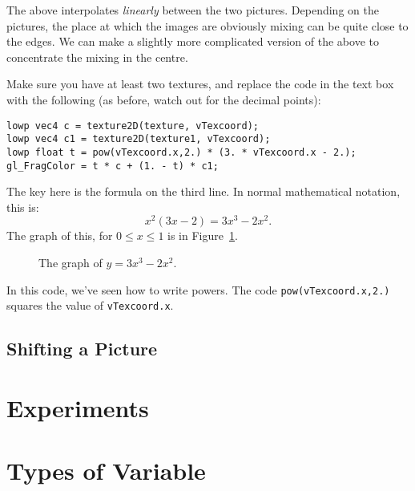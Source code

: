 \documentclass[
  html5,%
  mathml,%
  use filename%
]{internet}
\makeatletter
\let\origtikzsetnextfilename\tikzsetnextfilename
\def\tikzsetnextfilename#1{%
  \origtikzsetnextfilename{#1}
  \mysetlabel{#1}
}
\newcommand{\mysetlabel}[1]{%
  \gdef\mynextlabel{#1}}
\newcommand{\autolabel}{%
  \label{fig:\mynextlabel}
  \global\let\mynextlabel\relax
}
\let\prev@sec=\section
\renewcommand\section{\clearpage\prev@sec}
\makeatother
\begin{document}
The above interpolates \emph{linearly} between the two pictures.
Depending on the pictures, the place at which the images are obviously mixing can be quite close to the edges.
We can make a slightly more complicated version of the above to concentrate the mixing in the centre.

Make sure you have at least two textures, and replace the code in the text box with the following (as before, watch out for the decimal points):

\begin{tcolorbox}
\begin{verbatim}
lowp vec4 c = texture2D(texture, vTexcoord);
lowp vec4 c1 = texture2D(texture1, vTexcoord);
lowp float t = pow(vTexcoord.x,2.) * (3. * vTexcoord.x - 2.);
gl_FragColor = t * c + (1. - t) * c1;
\end{verbatim}
\end{tcolorbox}

The key here is the formula on the third line.
In normal mathematical notation, this is:
%
\[
  x^2 (3 x - 2) = 3 x^3 - 2 x^2.
  \]
%
The graph of this, for \(0 \le x \le 1\) is in Figure~\ref{fig:smoothstep}.

\begin{figure}
\centering
{}
\caption{The graph of \(y = 3 x^3 - 2 x^2\).}
\autolabel
\end{figure}

In this code, we've seen how to write powers.
The code \verb!pow(vTexcoord.x,2.)! squares the value of \verb!vTexcoord.x!.

\subsection{Shifting a Picture}



\section{Experiments}

\section{Types of Variable}
\end{document}
